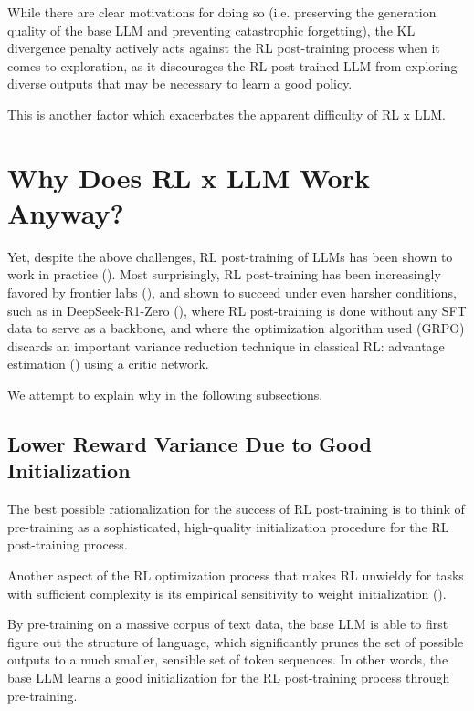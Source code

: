 \documentclass{article} %
\theoremstyle{definition}
\begin{document}
While there are clear motivations for doing so (i.e.
preserving the generation quality of the base LLM and preventing catastrophic forgetting),
the KL divergence penalty actively acts against the RL post-training process
when it comes to exploration, as it discourages the RL post-trained LLM
from exploring diverse outputs that may be necessary to learn a good policy.

This is another factor which exacerbates the apparent difficulty of RL x LLM.

\section{Why Does RL x LLM Work Anyway?}

Yet, despite the above challenges, RL post-training of LLMs has been shown to work
in practice (\cite{InstructGPT-2022}). Most surprisingly,
RL post-training has been increasingly favored by frontier labs
(\cite{Anthropic-2025, Lambert-et-al-2024}), and shown to succeed
under even harsher conditions, such as in DeepSeek-R1-Zero (\cite{DeepSeek-2025}),
where RL post-training is done without any SFT data to serve as a backbone,
and where the optimization algorithm used (GRPO) discards an important
variance reduction technique in classical RL: advantage 
estimation (\cite{Schulman-et-al-2017, Sutton-and-Barto-1998}) using a critic network.

We attempt to explain why in the following subsections.

\subsection{Lower Reward Variance Due to Good Initialization}

The best possible rationalization for the success of RL post-training
is to think of pre-training as a sophisticated, high-quality initialization
procedure for the RL post-training process.

Another aspect of the RL optimization process that makes RL unwieldy 
for tasks with sufficient complexity is its empirical sensitivity to 
weight initialization (\cite{Jones-2021, Andrychowicz-et-al-2020}).

By pre-training on a massive corpus of text data,
the base LLM is able to first figure out the structure of language,
which significantly prunes the set of possible outputs
to a much smaller, sensible set of token sequences.
In other words, the base LLM learns a good initialization for the RL 
post-training process through pre-training.
\end{document}
